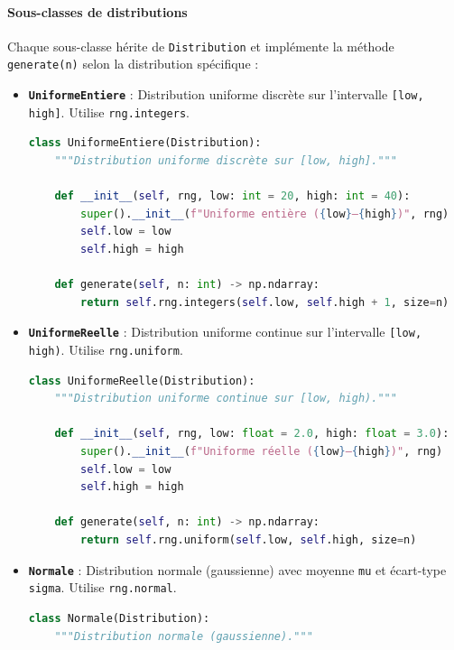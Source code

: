 \documentclass{article}
\begin{document}
\paragraph{Sous-classes de distributions}
Chaque sous-classe hérite de \texttt{Distribution} et implémente la méthode \texttt{generate(n)} selon la distribution spécifique :

\begin{itemize}
    \item \textbf{\texttt{UniformeEntiere}} : Distribution uniforme discrète sur l'intervalle \texttt{[low, high]}. Utilise \texttt{rng.integers}.
    \begin{lstlisting}[language=Python, caption=Implémentation de la classe UniformeEntiere]
class UniformeEntiere(Distribution):
    """Distribution uniforme discrète sur [low, high]."""

    def __init__(self, rng, low: int = 20, high: int = 40):
        super().__init__(f"Uniforme entière ({low}–{high})", rng)
        self.low = low
        self.high = high

    def generate(self, n: int) -> np.ndarray:
        return self.rng.integers(self.low, self.high + 1, size=n)
    \end{lstlisting}

    \item \textbf{\texttt{UniformeReelle}} : Distribution uniforme continue sur l'intervalle \texttt{[low, high)}. Utilise \texttt{rng.uniform}.
    \begin{lstlisting}[language=Python, caption=Implémentation de la classe UniformeReelle]
class UniformeReelle(Distribution):
    """Distribution uniforme continue sur [low, high)."""

    def __init__(self, rng, low: float = 2.0, high: float = 3.0):
        super().__init__(f"Uniforme réelle ({low}–{high})", rng)
        self.low = low
        self.high = high

    def generate(self, n: int) -> np.ndarray:
        return self.rng.uniform(self.low, self.high, size=n)
    \end{lstlisting}

    \item \textbf{\texttt{Normale}} : Distribution normale (gaussienne) avec moyenne \texttt{mu} et écart-type \texttt{sigma}. Utilise \texttt{rng.normal}.
    \begin{lstlisting}[language=Python, caption=Implémentation de la classe Normale]
class Normale(Distribution):
    """Distribution normale (gaussienne)."""


\end{lstlisting}
\end{itemize}
\end{document}
